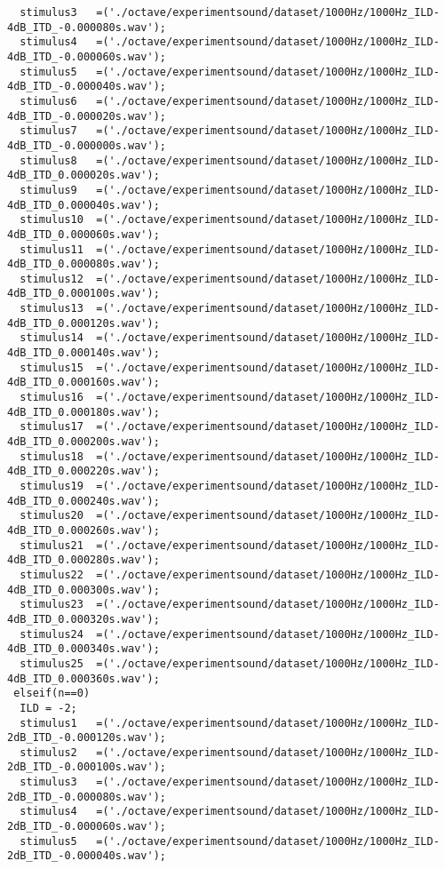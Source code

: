 {\begin{verbatim}
  stimulus3   =('./octave/experimentsound/dataset/1000Hz/1000Hz_ILD-4dB_ITD_-0.000080s.wav');
  stimulus4   =('./octave/experimentsound/dataset/1000Hz/1000Hz_ILD-4dB_ITD_-0.000060s.wav');
  stimulus5   =('./octave/experimentsound/dataset/1000Hz/1000Hz_ILD-4dB_ITD_-0.000040s.wav');
  stimulus6   =('./octave/experimentsound/dataset/1000Hz/1000Hz_ILD-4dB_ITD_-0.000020s.wav');
  stimulus7   =('./octave/experimentsound/dataset/1000Hz/1000Hz_ILD-4dB_ITD_-0.000000s.wav');
  stimulus8   =('./octave/experimentsound/dataset/1000Hz/1000Hz_ILD-4dB_ITD_0.000020s.wav');
  stimulus9   =('./octave/experimentsound/dataset/1000Hz/1000Hz_ILD-4dB_ITD_0.000040s.wav');
  stimulus10  =('./octave/experimentsound/dataset/1000Hz/1000Hz_ILD-4dB_ITD_0.000060s.wav');
  stimulus11  =('./octave/experimentsound/dataset/1000Hz/1000Hz_ILD-4dB_ITD_0.000080s.wav');
  stimulus12  =('./octave/experimentsound/dataset/1000Hz/1000Hz_ILD-4dB_ITD_0.000100s.wav');
  stimulus13  =('./octave/experimentsound/dataset/1000Hz/1000Hz_ILD-4dB_ITD_0.000120s.wav');
  stimulus14  =('./octave/experimentsound/dataset/1000Hz/1000Hz_ILD-4dB_ITD_0.000140s.wav');
  stimulus15  =('./octave/experimentsound/dataset/1000Hz/1000Hz_ILD-4dB_ITD_0.000160s.wav');
  stimulus16  =('./octave/experimentsound/dataset/1000Hz/1000Hz_ILD-4dB_ITD_0.000180s.wav');
  stimulus17  =('./octave/experimentsound/dataset/1000Hz/1000Hz_ILD-4dB_ITD_0.000200s.wav');
  stimulus18  =('./octave/experimentsound/dataset/1000Hz/1000Hz_ILD-4dB_ITD_0.000220s.wav');
  stimulus19  =('./octave/experimentsound/dataset/1000Hz/1000Hz_ILD-4dB_ITD_0.000240s.wav');
  stimulus20  =('./octave/experimentsound/dataset/1000Hz/1000Hz_ILD-4dB_ITD_0.000260s.wav');
  stimulus21  =('./octave/experimentsound/dataset/1000Hz/1000Hz_ILD-4dB_ITD_0.000280s.wav');
  stimulus22  =('./octave/experimentsound/dataset/1000Hz/1000Hz_ILD-4dB_ITD_0.000300s.wav');
  stimulus23  =('./octave/experimentsound/dataset/1000Hz/1000Hz_ILD-4dB_ITD_0.000320s.wav');
  stimulus24  =('./octave/experimentsound/dataset/1000Hz/1000Hz_ILD-4dB_ITD_0.000340s.wav');
  stimulus25  =('./octave/experimentsound/dataset/1000Hz/1000Hz_ILD-4dB_ITD_0.000360s.wav');
 elseif(n==0)
  ILD = -2;
  stimulus1   =('./octave/experimentsound/dataset/1000Hz/1000Hz_ILD-2dB_ITD_-0.000120s.wav');
  stimulus2   =('./octave/experimentsound/dataset/1000Hz/1000Hz_ILD-2dB_ITD_-0.000100s.wav');
  stimulus3   =('./octave/experimentsound/dataset/1000Hz/1000Hz_ILD-2dB_ITD_-0.000080s.wav');
  stimulus4   =('./octave/experimentsound/dataset/1000Hz/1000Hz_ILD-2dB_ITD_-0.000060s.wav');
  stimulus5   =('./octave/experimentsound/dataset/1000Hz/1000Hz_ILD-2dB_ITD_-0.000040s.wav');

\end{verbatim}}
